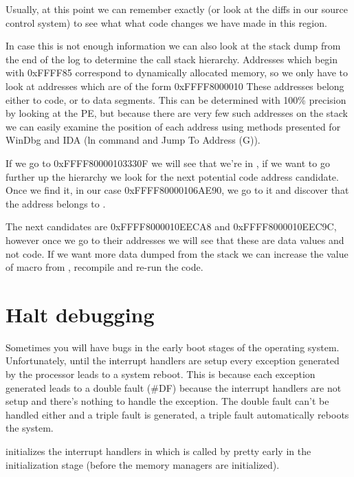 \begin{appendices}
Usually, at this point we can remember exactly (or look at the diffs in our source control system)
to see what what code changes we have made in this region.

In case this is not enough information we can also look at the stack dump from the end of the log to
determine the call stack hierarchy. Addresses which begin with 0xFFFF85 correspond to dynamically
allocated memory, so we only have to look at addresses which are of the form 0xFFFF8000010 These
addresses belong either to code, or to data segments. This can be determined with 100\% precision
by looking at the PE, but because there are very few such addresses on the stack we can easily 
examine the position of each address using methods presented for WinDbg and IDA (ln command and Jump To Address (G)).

If we go to  0xFFFF80000103330F we will see that we're in , if we
want to go further up the hierarchy we look for the next potential code address candidate. Once we
find it, in our case 0xFFFF80000106AE90, we go to it and discover that the address belongs to
.

The next candidates are  0xFFFF8000010EECA8 and  0xFFFF8000010EEC9C, however once we go to their
addresses we will see that these are data values and not code. If we want more data dumped from the
stack we can increase the value of  macro from
, recompile \projectname and re-run the code.

\section{Halt debugging}

Sometimes you will have bugs in the early boot stages of the operating system. Unfortunately, until
the interrupt handlers are setup every exception generated by the processor leads to a system reboot.
This is because each exception generated leads to a double fault (\#DF) because the interrupt
handlers are not setup and there's nothing to handle the exception. The double fault can't be
handled either and a triple fault is generated, a triple fault automatically reboots the system.

\projectname initializes the interrupt handlers in  which is called by
 pretty early in the initialization stage (before the memory managers are
initialized).


\end{appendices}
